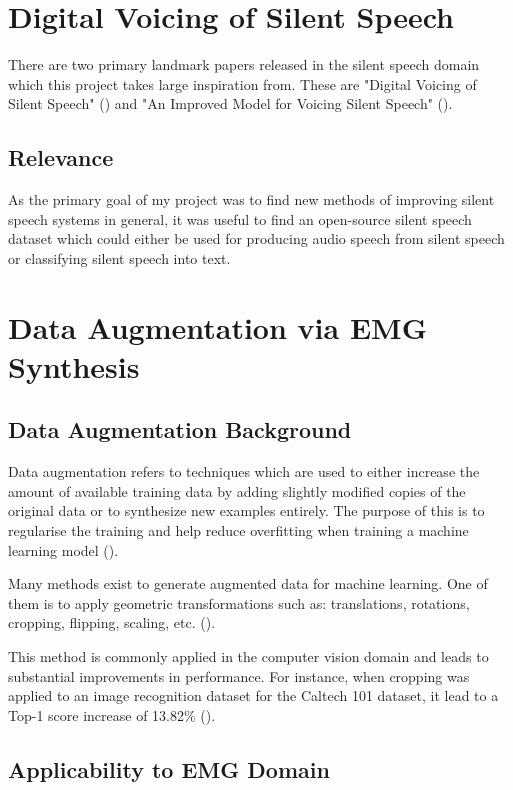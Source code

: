 \section{Digital Voicing of Silent Speech}

There are two primary landmark papers released in the silent speech domain
which this project takes large inspiration from. These are
"Digital Voicing of Silent Speech" (\cite{gaddy2020digital}) and
"An Improved Model for Voicing Silent Speech" (\cite{gaddy2021improved}).

\subsection{Relevance}

As the primary goal of my project was to find new methods of improving silent
speech systems in general, it was useful to find an open-source silent speech
dataset which could either be used for producing audio speech from silent
speech or classifying silent speech into text.

\section{Data Augmentation via EMG Synthesis}

\subsection{Data Augmentation Background}

Data augmentation refers to techniques which are used to either increase
the amount of available training data by adding slightly modified
copies of the original data or to synthesize new examples entirely.
The purpose of this is to regularise the training and help reduce overfitting
when training a machine learning model (\cite{data_augmentation_def}).

Many methods exist to generate augmented data for machine learning.
One of them is to apply geometric transformations such as: translations, rotations,
cropping, flipping, scaling, etc. (\cite{data_augmentation_def}).

This method is commonly applied in the computer vision domain and
leads to substantial improvements in performance. For instance,
when cropping was applied to an image recognition dataset for the
Caltech 101 dataset, it lead to a Top-1 score increase of 13.82\%
(\cite{geometric_augment}).

\subsection{Applicability to EMG Domain}

